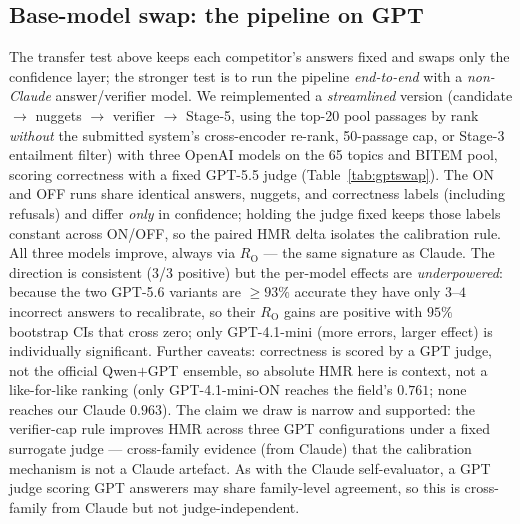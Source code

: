 \documentclass[sigconf,nonacm]{acmart}
\newcommand{\HMR}{\textsc{HMR}}
\newcommand{\RO}{R_{\mathrm{O}}}
\begin{document}
\subsection{Base-model swap: the pipeline on GPT}
\label{sec:gptswap}
The transfer test above keeps each competitor's answers fixed and swaps only the confidence
layer; the stronger test is to run the pipeline \emph{end-to-end} with a \emph{non-Claude}
answer/verifier model. We reimplemented a \emph{streamlined} version (candidate $\to$ nuggets $\to$ verifier
$\to$ Stage-5, using the top-20 pool passages by rank \emph{without} the submitted system's
cross-encoder re-rank, 50-passage cap, or Stage-3 entailment filter) with three OpenAI models
on the 65 topics and BITEM pool, scoring correctness with a fixed GPT-5.5 judge
(Table~\ref{tab:gptswap}). The ON and OFF runs share identical answers, nuggets, and
correctness labels (including refusals) and differ \emph{only} in confidence; holding the
judge fixed keeps those labels constant across ON/OFF, so the paired \HMR{} delta isolates the
calibration rule. All three models improve, always via $\RO$ --- the same signature as Claude.
The direction is consistent (3/3 positive) but the per-model effects are \emph{underpowered}:
because the two GPT-5.6 variants are $\ge93\%$ accurate they have only $3$--$4$ incorrect
answers to recalibrate, so their $\RO$ gains are positive with $95\%$ bootstrap CIs that cross
zero; only GPT-4.1-mini (more errors, larger effect) is individually significant. Further
caveats: correctness is scored by a GPT judge, not the official Qwen$+$GPT ensemble, so
absolute \HMR{} here is context, not a like-for-like ranking (only GPT-4.1-mini-ON reaches the
field's $0.761$; none reaches our Claude $0.963$). The claim we draw is narrow and supported:
the verifier-cap rule improves \HMR{} across three GPT configurations under a fixed surrogate
judge --- cross-family evidence (from Claude) that the calibration mechanism is not a Claude
artefact. As with the Claude self-evaluator, a GPT judge scoring GPT answerers may share
family-level agreement, so this is cross-family from Claude but not judge-independent.
\end{document}
